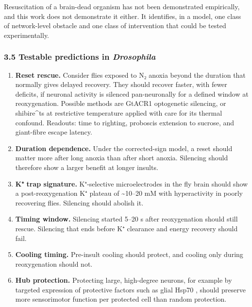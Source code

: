 \documentclass[11pt]{article}
\providecommand{\tightlist}{\setlength{\itemsep}{0pt}\setlength{\parskip}{0pt}}
\begin{document}
Resuscitation of a brain-dead organism has not been demonstrated empirically, and this work does not demonstrate it either. It identifies, in a model, one class of network-level obstacle and one class of intervention that could be tested experimentally.

\subsubsection{\texorpdfstring{3.5 Testable predictions in \emph{Drosophila}}{3.5 Testable predictions in Drosophila}}\label{testable-predictions-in-drosophila}

\begin{enumerate}
\def\labelenumi{\arabic{enumi}.}
\tightlist
\item
  \textbf{Reset rescue.} Consider flies exposed to N₂ anoxia beyond the duration that normally gives delayed recovery. They should recover faster, with fewer deficits, if neuronal activity is silenced pan-neuronally for a defined window at reoxygenation. Possible methods are GtACR1 optogenetic silencing, or shibire\^{}ts at restrictive temperature applied with care for its thermal confound. Readouts: time to righting, proboscis extension to sucrose, and giant-fibre escape latency.
\item
  \textbf{Duration dependence.} Under the corrected-sign model, a reset should matter more after long anoxia than after short anoxia. Silencing should therefore show a larger benefit at longer insults.
\item
  \textbf{K⁺ trap signature.} K⁺-selective microelectrodes in the fly brain \cite{armstrong2011,rodriguez2012} should show a post-reoxygenation K⁺ plateau of \textasciitilde10--20 mM with hyperactivity in poorly recovering flies. Silencing should abolish it.
\item
  \textbf{Timing window.} Silencing started 5--20 s after reoxygenation should still rescue. Silencing that ends before K⁺ clearance and energy recovery should fail.
\item
  \textbf{Cooling timing.} Pre-insult cooling should protect, and cooling only during reoxygenation should not.
\item
  \textbf{Hub protection.} Protecting large, high-degree neurons, for example by targeted expression of protective factors such as glial Hsp70 \cite{armstrong2011}, should preserve more sensorimotor function per protected cell than random protection.
\end{enumerate}
\end{document}
